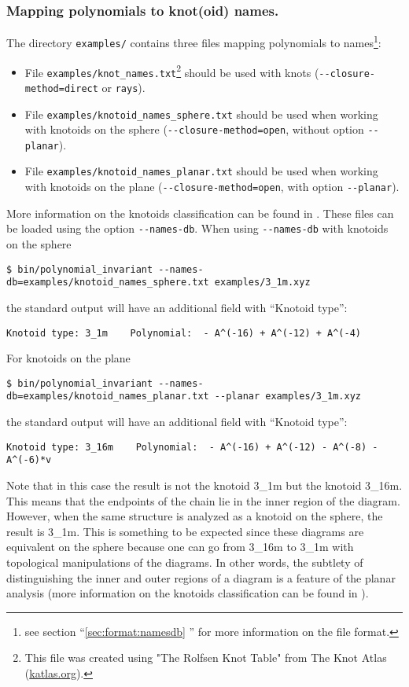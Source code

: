 \subsubsection{Mapping polynomials to knot(oid) names.}
The directory \lstinline{examples/} contains three files mapping polynomials to names\footnote{see section ``\ref{sec:format:namesdb} '' for more information on the file format.}:
\begin{itemize}
\item File \lstinline{examples/knot_names.txt}\footnote{This file was created using "The Rolfsen Knot Table" from The Knot Atlas (\url{katlas.org}).} should be used with knots (\lstinline{--closure-method=direct} or \lstinline{rays}).
\item File \lstinline{examples/knotoid_names_sphere.txt} should be used when working with knotoids on the sphere (\lstinline{--closure-method=open}, without option \lstinline{--planar}).
\item File \lstinline{examples/knotoid_names_planar.txt} should be used when working with knotoids on the plane (\lstinline{--closure-method=open}, with option \lstinline{--planar}).
\end{itemize}
More information on the knotoids classification can be found in \cite{goundaroulis2019}. These files can be loaded using the option  \lstinline{--names-db}.  When using \lstinline{--names-db} with knotoids on the sphere
\begin{lstlisting}
$ bin/polynomial_invariant --names-db=examples/knotoid_names_sphere.txt examples/3_1m.xyz
\end{lstlisting}
the standard output will have an additional field with ``Knotoid type'':
\begin{lstlisting}
Knotoid type: 3_1m    Polynomial:  - A^(-16) + A^(-12) + A^(-4)
\end{lstlisting}
For knotoids on the plane
\begin{lstlisting}
$ bin/polynomial_invariant --names-db=examples/knotoid_names_planar.txt --planar examples/3_1m.xyz
\end{lstlisting}
the standard output will have an additional field with ``Knotoid type'':
\begin{lstlisting}
Knotoid type: 3_16m    Polynomial:  - A^(-16) + A^(-12) - A^(-8) - A^(-6)*v
\end{lstlisting}
Note that in this case the result is not the knotoid 3\_1m but the knotoid 3\_16m. This means that the endpoints of the chain lie in the inner region of the diagram. However, when the same structure is analyzed as a knotoid on the sphere, the result is 3\_1m. This is something to be expected since these diagrams are equivalent on the sphere because one can go from 3\_16m to 3\_1m with topological manipulations of the diagrams. In other words, the subtlety of distinguishing the inner and outer regions of a diagram is a feature of the planar analysis (more information on the knotoids classification can be found in \cite{goundaroulis2019}). 




